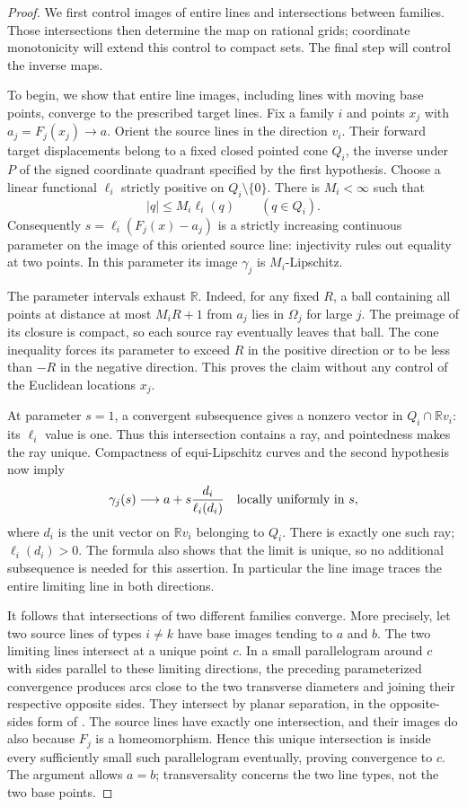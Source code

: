 \begin{proof}
We first control images of entire lines and intersections between
families. Those intersections then determine the map on rational grids; coordinate
monotonicity will extend this control to compact sets. The final step
will control the inverse maps.

To begin, we show that entire line images, including lines with moving base
points, converge to the prescribed target lines.  Fix a family $i$ and
points $x_j$ with $a_j=F_j(x_j)\to a$.  Orient the source lines in the
direction $v_i$.  Their forward target displacements belong to a fixed
closed pointed cone $Q_i$, the inverse under $P$ of the signed coordinate
quadrant specified by the first hypothesis.  Choose a linear functional
$\ell_i$ strictly positive on $Q_i\setminus\{0\}$.  There is $M_i<\infty$
such that
\[
 |q|\le M_i\ell_i(q)\qquad(q\in Q_i).
\]
Consequently $s=\ell_i(F_j(x)-a_j)$ is a strictly increasing continuous
parameter on the image of this oriented source line: injectivity rules
out equality at two points.  In this parameter its image $\gamma_j$ is
$M_i$-Lipschitz.

The parameter intervals exhaust $\mathbb R$.  Indeed, for any fixed
$R$, a ball containing all points at distance at most $M_iR+1$ from
$a_j$ lies in $\Omega_j$ for large $j$.  The preimage of its closure is
compact, so each source ray eventually leaves that ball.  The cone
inequality forces its parameter to exceed $R$ in the positive direction
or to be less than $-R$ in the negative direction.  This proves the
claim without any control of the Euclidean locations $x_j$.

At parameter $s=1$, a convergent subsequence gives a nonzero vector
in $Q_i\cap\mathbb R v_i$: its $\ell_i$ value is one.  Thus this
intersection contains a ray, and pointedness makes the ray unique.
Compactness of equi-Lipschitz curves and the second hypothesis now imply
\[
 \gamma_j(s)\longrightarrow a+s\frac{d_i}{\ell_i(d_i)}
 \quad\hbox{locally uniformly in }s,
\]
where $d_i$ is the unit vector on $\mathbb R v_i$ belonging to $Q_i$.
There is exactly one such ray; $\ell_i(d_i)>0$.  The formula also shows
that the limit is unique, so no additional subsequence is needed for
this assertion.  In particular the line image traces the entire
limiting line in both directions.

It follows that intersections of two different families converge.
More precisely, let two source lines of types $i\ne k$ have base
images tending to $a$ and $b$.  The two limiting lines intersect at a
unique point $c$.  In a small parallelogram around $c$ with sides
parallel to these limiting directions, the preceding parameterized
convergence produces arcs close to the two transverse diameters and
joining their respective opposite sides.  They intersect by planar
separation, in the opposite-sides form of
\cite[Lemma~2.11]{PascolettiZanolin2010}.  The source lines have exactly one intersection, and their
images do also because $F_j$ is a homeomorphism.  Hence this unique
intersection is inside every sufficiently small such parallelogram
eventually, proving convergence to $c$.  The argument allows $a=b$;
transversality concerns the two line types, not the two base points.


\end{proof}
